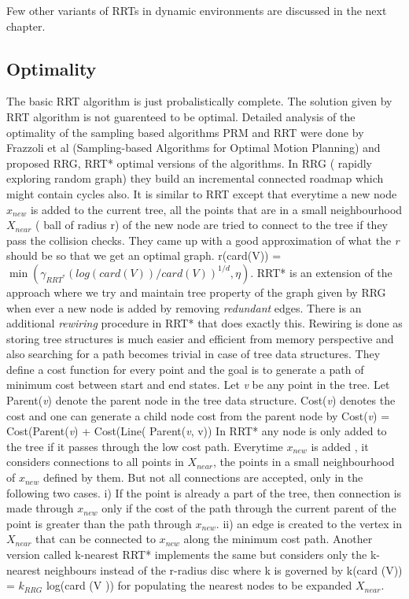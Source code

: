 \documentclass[MTech]{iitmdiss}
\begin{document}
Few other variants of RRTs in dynamic environments are discussed in the next chapter.

 \subsection{Optimality}
 The basic RRT algorithm is just probalistically complete. The solution given by RRT algorithm is not guarenteed to be optimal. Detailed analysis of the optimality of the sampling based algorithms PRM and RRT were done by Frazzoli  et al (Sampling-based Algorithms for Optimal Motion Planning) and proposed  RRG, RRT* optimal versions of the algorithms.
  In RRG ( rapidly exploring random graph) they build an incremental connected roadmap which might contain cycles also. It is similar to RRT except that everytime a new node $x_{new}$ is added to the current tree, all the points that are in a small neighbourhood $X_{near}$ ( ball of radius r) of the new node are tried to connect to the tree if they pass the collision checks. 
 They came up with a good approximation of what the \emph{r} should be so that we get an optimal graph. r(card(V)) = $\min(\gamma_{RRT^*} (log(card(V))/card(V))^{1/d}  , \eta   )$.   RRT* is an extension of the approach where we try and maintain tree property of the graph given by RRG when ever a new node is added by removing \emph{redundant} edges. There is an additional \emph{rewiring} procedure in RRT*  that does exactly this. Rewiring is done as storing tree structures is much easier and efficient from memory perspective and also searching for a path becomes trivial in case of tree data structures. They define a cost function for every point and the goal is to generate a path of minimum cost between start and end states. Let \textit{v} be any point in the tree. Let Parent(\textit{v}) denote the parent node in the tree data structure.  Cost(\textit{v}) denotes the cost and one can generate a child node cost from the parent node by Cost(\textit{v}) = Cost(Parent(\textit{v}) +  Cost(Line( Parent(\textit{v}, v)) In RRT* any node is only added to the tree if it passes through the low cost path. Everytime $x_{new}$ is added , it considers connections to all points in $X_{near}$, the points in a small neighbourhood of $x_{new}$ defined by them. But not all connections are accepted, only in the following two cases. i) If the point is already a part of the tree, then connection is made through $x_{new}$ only if the cost of the path through the current parent of the point is greater than the path through $x_{new}$.  ii) an edge is created to the vertex in $X_{near}$ that can be connected to $x_{new }$ along the minimum cost path. Another version called k-nearest RRT* implements the same but considers only the k-nearest neighbours instead of the r-radius disc where k is governed by k(card (V)) = $k_{RRG}$ log(card (V )) for populating the nearest nodes to be expanded $X_{near}$.
 
\end{document}
